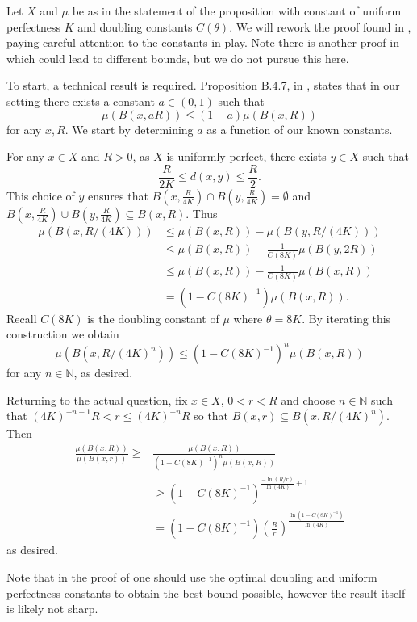 Let $X$ and $\mu$ be as in the statement of the proposition with constant of uniform perfectness $K$ and doubling constants $C(\theta)$. We will rework the proof found in \cite[lemma 3.1]{anti1}, paying careful attention to the constants in play. Note there is another proof in \cite[Lemma 4.5]{eino-pablo} which could lead to different bounds, but we do not pursue this here.
	
To start, a technical result is required. Proposition B.4.7, in \cite{gromov}, states that in our setting there exists a constant $a \in (0,1)$ such that 
\[
\mu(B(x,aR)) \le (1-a) \mu(B(x,R))
\]
for any $x,R$. We start by determining $a$ as a function of our known constants. 
	
For any $x\in X$ and $R>0$, as $X$ is uniformly perfect, there exists $y \in X$ such that $$\frac{R}{2K} \le d(x,y) \le \frac{R}{2}.$$ This choice of $y$ ensures that $B(x,\frac{R}{4K}) \cap B(y,\frac{R}{4K}) = \emptyset $ and $B(x,\frac{R}{4K}) \cup B(y,\frac{R}{4K}) \subseteq B(x,R)$. Thus
\begin{align*}
\mu(B(x,R/(4K))) &\le \mu(B(x,R)) - \mu(B(y, R/(4K)))\\
& \le \mu(B(x,R)) - \frac{1}{C(8K)}\mu(B(y,2R)) \\
& \le \mu(B(x,R)) - \frac{1}{C(8K)}\mu(B(x,R)) \\
& = (1-C(8K)^{-1}) \mu(B(x,R)).
\end{align*}
Recall $C(8K)$ is the doubling constant of $\mu$ where $\theta = 8K$. By iterating this construction we obtain
\[
\mu(B(x,R/(4K)^n)) \le (1-C(8K)^{-1})^n \mu(B(x,R))
\]
for any $n\in \mathbb{N}$, as desired.
	
Returning to the actual question, fix $x\in X$, $0 < r < R$ and choose $n\in \mathbb{N}$ such that $(4K)^{-n-1}R < r \le (4K)^{-n}R$ so that $B(x,r) \subseteq B(x,R/(4K)^{n})$. Then
\begin{align*}
\frac{\mu(B(x,R))}{\mu(B(x,r))} \ge& \frac{\mu(B(x,R))}{(1-C(8K)^{-1})^n\mu(B(x,R))} \\
& \ge (1-C(8K)^{-1})^{\frac{-\ln(R/r)}{\ln(4K)} + 1}\\
& = (1-C(8K)^{-1})\left(\frac{R}{r}\right)^{\frac{\ln(1-C(8K)^{-1})}{\ln(4K)}}
\end{align*}
as desired.
	
Note that in the proof of \cite{gromov} one should use the optimal doubling and uniform perfectness constants to obtain the best bound possible, however the result itself is likely not sharp.






